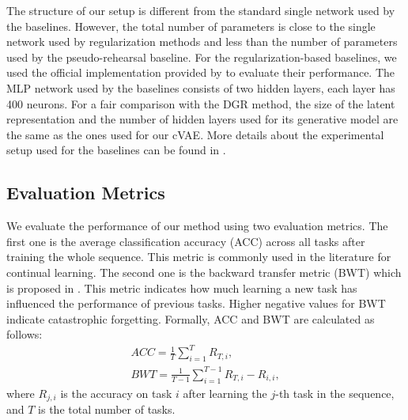 \documentclass[letterpaper]{article} %
\begin{document}
The structure of our setup is different from the standard single network used by the baselines. However, the total number of parameters is close to the single network used by regularization methods and less than the number of parameters used by the pseudo-rehearsal baseline. For the regularization-based baselines, we used the official implementation provided by \cite{VanDeVen2018a} to evaluate their performance. The MLP network used by the baselines consists of two hidden layers, each layer has 400 neurons. For a fair comparison with the DGR method, the size of the latent representation and the number of hidden layers used for its generative model are the same as the ones used for our cVAE. More details about the experimental setup used for the baselines can be found in \cite{VanDeVen2018a}.

\subsection{Evaluation Metrics}
We evaluate the performance of our method using two evaluation metrics. The first one is the average classification accuracy (ACC) across all tasks after training the whole sequence. This metric is commonly used in the literature for continual learning. The second one is the backward transfer metric (BWT) which is proposed in \cite{lopez2017gradient}. This metric indicates how much learning a new task has influenced the performance of previous tasks. Higher negative values for BWT indicate catastrophic forgetting. Formally, ACC and BWT are calculated as follows: 
\begin{equation}
\label{ACC_BWT}
\begin{split}
   ACC = \frac{1}{T} \sum_{i=1}^{T} R_{T,i}, \\
   BWT = \frac{1}{T-1} \sum_{i=1}^{T-1} R_{T,i} - R_{i,i}, 
\end{split}
\end{equation}
where $R_{j,i}$ is the accuracy on task ${i}$ after learning
the $j$-th task in the sequence, and $T$ is the total number of tasks.
\end{document}
